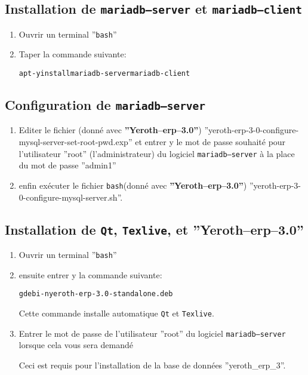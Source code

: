 \documentclass[a4paper, 10pt]{article}
\newcommand{\yerotherptroiszero}{\textbf{''Yeroth--erp--3.0''}\xspace}
\newcommand{\texlive}{\texttt{Texlive}\xspace}
\newcommand{\bash}{\texttt{bash}\xspace}
\newcommand{\qt}{\texttt{Qt}\xspace}
\newcommand{\mariadbserver}{\texttt{mariadb--server}\xspace}
\newcommand{\mariadbclient}{\texttt{mariadb--client}\xspace}
\newcommand{\rootcommand}[1]{
\begin{center}
\textcolor{purplish}{#1\xspace}
\end{center}}
\begin{document}
\subsection{Installation de \mariadbserver et \mariadbclient}

\begin{enumerate}[1)]
	\item Ouvrir un terminal ''\bash''
	\item Taper la commande suivante:
		\begin{alltt}
			\rootcommand{apt -y install mariadb-server mariadb-client}
		\end{alltt}		
\end{enumerate} 

\subsection{Configuration de \mariadbserver}

\begin{enumerate}[1)]
	\item Editer le fichier (donn\'e avec \yerotherptroiszero)
		''yeroth-erp-3-0-configure-mysql-server-set-root-pwd.exp''
		et entrer y le mot de passe souhait\'e pour
		l'utilisateur ''root'' (l'administrateur) du logiciel \mariadbserver
		\`a la place du mot de passe ''admin1''
		
	\item enfin ex\'ecuter le fichier \bash (donn\'e avec \yerotherptroiszero)
		''yeroth-erp-3-0-configure-mysql-server.sh''.	
\end{enumerate}

\subsection{Installation de \qt, \texlive, et \yerotherptroiszero}

\begin{enumerate}[1)]
	\item Ouvrir un terminal ''\bash''
	\item ensuite entrer y la commande suivante:
		\begin{alltt}
			\rootcommand{gdebi -n yeroth-erp-3.0-standalone.deb}
		\end{alltt}
		
		Cette commande installe automatique \qt et \texlive.
		
	\item Entrer le mot de passe de l'utilisateur ''root''
		du logiciel \mariadbserver lorsque cela vous
		sera demand\'e
		
		Ceci est requis pour l'installation de la base
		de donn\'ees ''yeroth\_erp\_3''.
\end{enumerate}
\end{document}
